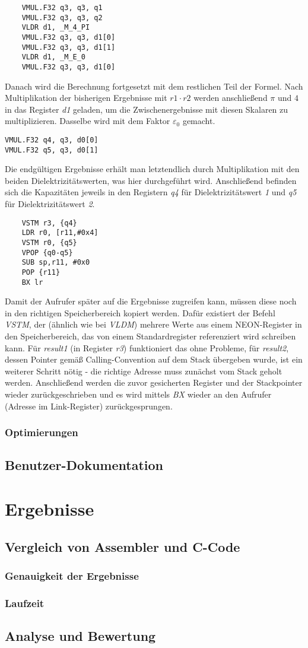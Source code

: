 \documentclass[11pt]{scrartcl}
\begin{document}
\begin{verbatim}
	VMUL.F32 q3, q3, q1
	VMUL.F32 q3, q3, q2
	VLDR d1, _M_4_PI
	VMUL.F32 q3, q3, d1[0]
	VMUL.F32 q3, q3, d1[1]
	VLDR d1, _M_E_0
	VMUL.F32 q3, q3, d1[0]
\end{verbatim}
Danach wird die Berechnung fortgesetzt mit dem restlichen Teil der Formel. Nach Multiplikation der bisherigen Ergebnisse mit $r1 \cdot r2$ werden anschließend $\pi$ und $4$ in das Register \emph{d1} geladen, um die Zwischenergebnisse mit diesen Skalaren zu multiplizieren. Dasselbe wird mit dem Faktor $\varepsilon_{0}$ gemacht.\begin{verbatim}
VMUL.F32 q4, q3, d0[0]
VMUL.F32 q5, q3, d0[1]
\end{verbatim}
Die endgültigen Ergebnisse erhält man letztendlich durch Multiplikation mit den beiden Dielektrizitätswerten, was hier durchgeführt wird. Anschließend befinden sich die Kapazitäten jeweils in den Registern \emph{q4} für Dielektrizitätswert \emph{1} und \emph{q5} für Dielektrizitätswert \emph{2}.
\begin{verbatim}
	VSTM r3, {q4}
	LDR r0, [r11,#0x4]
	VSTM r0, {q5}
	VPOP {q0-q5}
	SUB sp,r11, #0x0
	POP {r11}
	BX lr
\end{verbatim}
Damit der Aufrufer später auf die Ergebnisse zugreifen kann, müssen diese noch in den richtigen Speicherbereich kopiert werden. Dafür existiert der Befehl \emph{VSTM}, der (ähnlich wie bei \emph{VLDM}) mehrere Werte aus einem NEON-Register in den Speicherbereich, das von einem Standardregister referenziert wird schreiben kann. Für \emph{result1} (in Register \emph{r3}) funktioniert das ohne Probleme, für \emph{result2}, dessen Pointer gemäß Calling-Convention auf dem Stack übergeben wurde, ist ein weiterer Schritt nötig - die richtige Adresse muss zunächst vom Stack geholt werden. Anschließend werden die zuvor gesicherten Register und der Stackpointer wieder zurückgeschrieben und es wird mittels \emph{BX} wieder an den Aufrufer (Adresse im Link-Register) zurückgesprungen.
\subsubsection{Optimierungen}
\subsection{Benutzer-Dokumentation}
\section{Ergebnisse}
\subsection{Vergleich von Assembler und C-Code}
\subsubsection{Genauigkeit der Ergebnisse}
\subsubsection{Laufzeit}
\subsection{Analyse und Bewertung}
\end{document}
